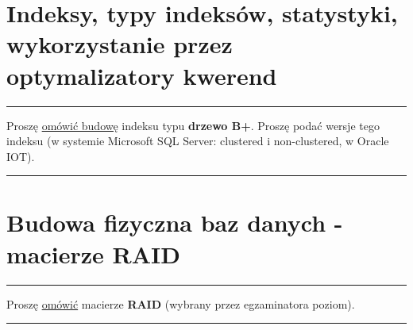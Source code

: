 \documentclass[a5paper,6pt]{article}
\newcommand{\horrule}[1]{\rule{\linewidth}{#1}}
\begin{document}

    \section{Indeksy, typy indeksów, statystyki, wykorzystanie przez
             optymalizatory kwerend} %
    \label{sec:indeksy}

    \horrule{0.5pt}
    Proszę \underline{omówić budowę} indeksu typu \textbf{drzewo B+}. Proszę
    podać wersje tego indeksu (w systemie Microsoft SQL Server: clustered i
    non-clustered, w Oracle IOT).\\
    \horrule{0.5pt}


    \section{Budowa fizyczna baz danych - macierze RAID} %
    \label{sec:budowa_fizyczna_baz_danych_macierze_raid}

    \horrule{0.5pt}
    Proszę \underline{omówić} macierze \textbf{RAID} (wybrany przez
    egzaminatora poziom).\\
    \horrule{0.5pt}
\end{document}
